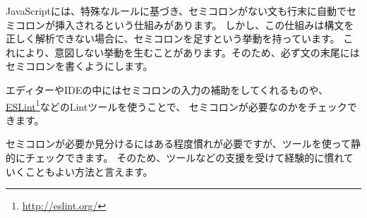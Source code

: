 JavaScriptには、特殊なルールに基づき、セミコロンがない文も行末に自動でセミコロンが挿入されるという仕組みがあります。
しかし、この仕組みは構文を正しく解析できない場合に、セミコロンを足すという挙動を持っています。
これにより、意図しない挙動を生むことがあります。そのため、必ず文の末尾にはセミコロンを書くようにします。

エディターやIDEの中にはセミコロンの入力の補助をしてくれるものや、\href{http://eslint.org/}{ESLint}\footnote{\url{http://eslint.org/}}などのLintツールを使うことで、
セミコロンが必要なのかをチェックできます。

セミコロンが必要か見分けるにはある程度慣れが必要ですが、ツールを使って静的にチェックできます。
そのため、ツールなどの支援を受けて経験的に慣れていくこともよい方法と言えます。
